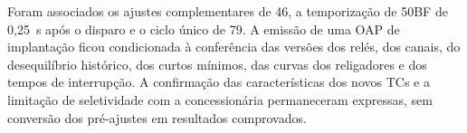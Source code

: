 Foram associados os ajustes complementares de 46, a temporização de 50BF de 0,25~s após o disparo e o ciclo único de 79. A emissão de uma OAP de implantação ficou condicionada à conferência das versões dos relés, dos canais, do desequilíbrio histórico, dos curtos mínimos, das curvas dos religadores e dos tempos de interrupção. A confirmação das características dos novos TCs e a limitação de seletividade com a concessionária permaneceram expressas, sem conversão dos pré-ajustes em resultados comprovados.
